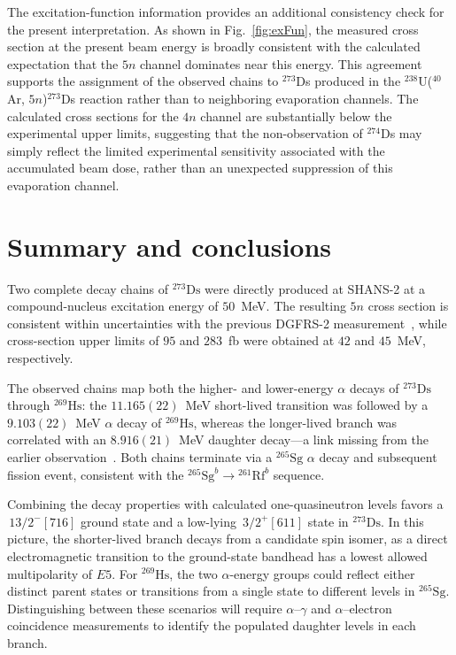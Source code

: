 \documentclass[final,5p,times,twocolumn,number,sort&compress]{elsarticle}
\begin{document}
The excitation-function information provides an additional consistency check for the present interpretation. As shown in Fig.~\ref{fig:exFun}, the measured cross section at the present beam energy is broadly consistent with the calculated expectation that the $5n$ channel dominates near this energy. This agreement supports the assignment of the observed chains to $^{273}$Ds produced in the $^{238}$U($^{40}$Ar, $5n$)$^{273}$Ds reaction rather than to neighboring evaporation channels.
 The calculated cross sections for the $4n$ channel are substantially below the experimental upper limits, suggesting that the non-observation of $^{274}$Ds may simply reflect the limited experimental sensitivity associated with the accumulated beam dose, rather than an unexpected suppression of this evaporation channel.


\section{Summary and conclusions}

Two complete decay chains of $^{273}\mathrm{Ds}$ were directly produced at SHANS-2 at a compound-nucleus excitation energy of $50$~MeV. The resulting $5n$ cross section is consistent within uncertainties with the previous DGFRS-2 measurement~\cite{oganessian2024SynthesisDecayProperties}, while cross-section upper limits of $95$ and $283$~fb were obtained at $42$ and $45$~MeV, respectively.

The observed chains map both the higher- and lower-energy $\alpha$ decays of $^{273}\mathrm{Ds}$ through $^{269}\mathrm{Hs}$: the $11.165(22)$~MeV short-lived transition was followed by a $9.103(22)$~MeV $\alpha$ decay of $^{269}\mathrm{Hs}$, whereas the longer-lived branch was correlated with an $8.916(21)$~MeV daughter decay---a link missing from the earlier observation~\cite{oganessian2024SynthesisDecayProperties}. Both chains terminate via a $^{265}\mathrm{Sg}$ $\alpha$ decay and subsequent fission event, consistent with the $^{265}\mathrm{Sg}^{b}\rightarrow{}^{261}\mathrm{Rf}^{b}$ sequence.

Combining the decay properties with calculated one-quasineutron levels favors a $\,13/2^{-}[716]$ ground state and a low-lying $\,3/2^{+}[611]$ state in $^{273}\mathrm{Ds}$. In this picture, the shorter-lived branch decays from a candidate spin isomer, as a direct electromagnetic transition to the ground-state bandhead has a lowest allowed multipolarity of $E5$. For $^{269}\mathrm{Hs}$, the two $\alpha$-energy groups could reflect either distinct parent states or transitions from a single state to different levels in $^{265}\mathrm{Sg}$. Distinguishing between these scenarios will require $\alpha$--$\gamma$ and $\alpha$--electron coincidence measurements to identify the populated daughter levels in each branch.
\end{document}
